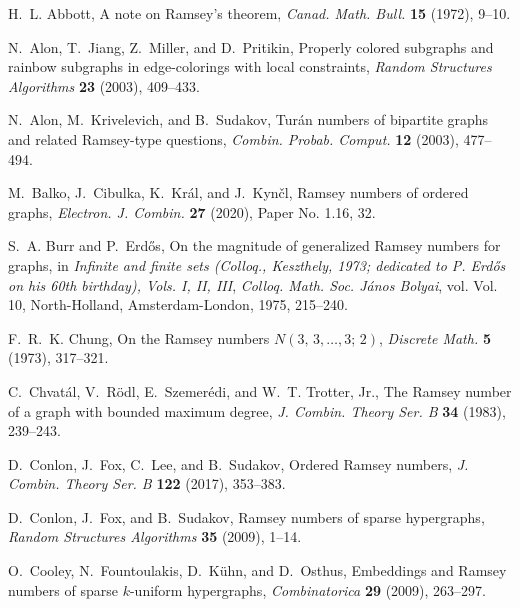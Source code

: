 \documentclass[a4paper,11pt]{article}
\theoremstyle{definition}
\begin{document}
% 
% 
\begin{thebibliography}{10}
\providecommand{\url}[1]{\texttt{#1}}
\providecommand{\urlprefix}{URL }
\providecommand{\eprint}[2][]{\url{#2}}

H.~L. Abbott, A note on {R}amsey's theorem, \emph{Canad. Math. Bull.} \textbf{15} (1972), 9--10.

N.~Alon, T.~Jiang, Z.~Miller, and D.~Pritikin, Properly colored subgraphs and rainbow subgraphs in edge-colorings with local constraints, \emph{Random Structures Algorithms} \textbf{23} (2003), 409--433.

N.~Alon, M.~Krivelevich, and B.~Sudakov, Tur\'an numbers of bipartite graphs and related {R}amsey-type questions, \emph{Combin. Probab. Comput.} \textbf{12} (2003), 477--494.

M.~Balko, J.~Cibulka, K.~Kr\'al, and J.~Kyn\v{c}l, Ramsey numbers of ordered graphs, \emph{Electron. J. Combin.} \textbf{27} (2020), Paper No. 1.16, 32.

S.~A. Burr and P.~Erd\H{o}s, On the magnitude of generalized {R}amsey numbers for graphs, in \emph{Infinite and finite sets ({C}olloq., {K}eszthely, 1973; dedicated to {P}. {E}rd\H{o}s on his 60th birthday), {V}ols. {I}, {II}, {III}}, \emph{Colloq. Math. Soc. J\'{a}nos Bolyai}, vol. Vol. 10, North-Holland, Amsterdam-London, 1975,  215--240.

F.~R.~K. Chung, On the {R}amsey numbers {$N(3,\,3,\dots, 3;\,2)$}, \emph{Discrete Math.} \textbf{5} (1973), 317--321.

C.~Chvat\'{a}l, V.~R\"{o}dl, E.~Szemer\'{e}di, and W.~T. Trotter, Jr., The {R}amsey number of a graph with bounded maximum degree, \emph{J. Combin. Theory Ser. B} \textbf{34} (1983), 239--243.

D.~Conlon, J.~Fox, C.~Lee, and B.~Sudakov, Ordered {R}amsey numbers, \emph{J. Combin. Theory Ser. B} \textbf{122} (2017), 353--383.

D.~Conlon, J.~Fox, and B.~Sudakov, Ramsey numbers of sparse hypergraphs, \emph{Random Structures Algorithms} \textbf{35} (2009), 1--14.

O.~Cooley, N.~Fountoulakis, D.~K\"uhn, and D.~Osthus, Embeddings and {R}amsey numbers of sparse {$k$}-uniform hypergraphs, \emph{Combinatorica} \textbf{29} (2009), 263--297.


\end{thebibliography}
\end{document}
